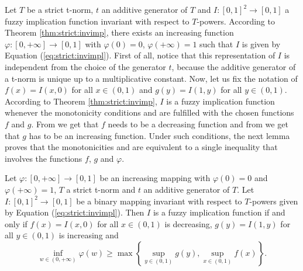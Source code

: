 Let $T$ be a strict t-norm, $t$ an additive generator of $T$ and $I:[0,1]^2 \to [0,1]$ a fuzzy implication function invariant with respect to $T$-powers. According to Theorem \ref{thm:strict:invimp}, there exists an increasing function $\varphi:[0,+\infty] \to [0,1]$ with $\varphi(0)=0$, $\varphi(+\infty)=1$ such that $I$ is given by Equation (\ref{eq:strict:invimpl}). First of all, notice that this representation of $I$ is independent from the choice of the generator $t$, because the additive generator of a t-norm is unique up to a multiplicative constant. Now, let us fix the notation of $f(x)=I(x,0)$ for all $x \in (0,1)$ and $g(y)=I(1,y)$ for all $y \in (0,1)$. According to Theorem \ref{thm:strict:invimp}, $I$ is a fuzzy implication function whenever the monotonicity conditions \Ione and \Itwo are fulfilled with the chosen functions $f$ and $g$. From \Ione we get that $f$ needs to be a decreasing function and from \Itwo we get that $g$ has to be an increasing function. Under such conditions, the next lemma proves that the monotonicities  \Ione and \Itwo are equivalent to a single inequality that involves the functions $f$, $g$ and $\varphi$.
\begin{lemma}\label{lem:strict:monotonicity_condition}
	Let $\varphi:[0,+\infty]\to[0,1]$ be an increasing mapping with $\varphi(0)=0$ and $\varphi(+\infty)=1$, $T$ a strict t-norm and $t$ an additive generator of $T$. Let $I:[0,1]^2\to[0,1]$ be a binary mapping invariant with respect to $T$-powers given by Equation (\ref{eq:strict:invimpl}). Then $I$ is a fuzzy implication function if and only if $f(x)=I(x,0)$ for all $x\in(0,1)$ is decreasing, $g(y)=I(1,y)$ for all $y\in(0,1)$ is increasing and
	\begin{equation}\label{eq:strict:monotonicity_condition}
		\displaystyle\inf_{w \in (0,+\infty)} \varphi (w) \geq \max \left\lbrace \sup_{y \in (0,1)} g(y), \sup_{x \in (0,1)} f(x) \right\rbrace.
	\end{equation}
\end{lemma}
